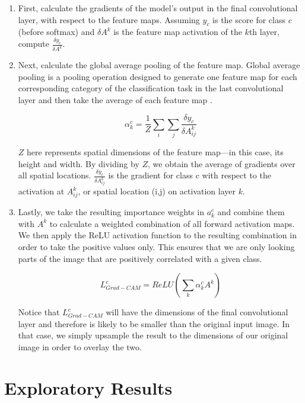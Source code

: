 \documentclass [MAS] {uclathes}
\begin{document}
\begin{enumerate}
    \item First, calculate the gradients of the model’s output in the final convolutional layer, with respect to the 
    feature maps. Assuming \(y_{c}\) is the score for class \(c\) (before softmax) and \(\delta A^{k}\) is the feature 
    map activation of the \(k\)th layer, compute \(\frac{\delta y_{c}}{\delta A^{k}}\). 
    
    \item Next, calculate the global average pooling of the feature map. Global average pooling is a pooling operation 
    designed to generate one feature map for each corresponding category of the classification task in the last 
    convolutional layer and then take the average of each feature map \cite{networkinnetwork}.
    
    \[\alpha_{k}^{c} = \frac{1}{Z}\sum_{i}\sum_{j}\frac{\delta y_{c}}{\delta A_{ij}^{k}}\]

    \(Z\) here represents spatial dimensions of the feature map---in this case, its height and width. By dividing by 
    \(Z\), we obtain the average of gradients over all spatial locations. \(\frac{\delta y_{c}}{\delta A_{ij}^{k}}\) is 
    the gradient for class c with respect to the activation at \(A_{ij}^{k}\), or spatial location (i,j) on activation 
    layer \(k\).
    
    \item Lastly, we take the resulting importance weights in \(a_{k}^{c}\) and combine them with \(A^{k}\) to calculate 
    a weighted combination of all forward activation maps. We then apply the ReLU activation function to the resulting 
    combination in order to take the positive values only. This ensures that we are only looking parts of the image that 
    are positively correlated with a given class.

    \[L_{Grad-CAM}^{c} = ReLU(\sum_{k}\alpha_{k}^{c}A^{k})\]

    Notice that \(L_{Grad-CAM}^{c}\) will have the dimensions of the final convolutional layer and therefore is likely 
    to be smaller than the original input image. In that case, we simply upsample the result to the dimensions of our 
    original image in order to overlay the two.
\end{enumerate}

\section{Exploratory Results}
\end{document}
